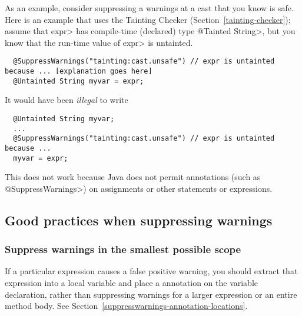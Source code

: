As an example, consider suppressing a warnings at a cast that you know is safe.  Here is an example
that uses the Tainting Checker (Section~\ref{tainting-checker}); assume
that \<expr> has compile-time (declared) type \<@Tainted String>, but you
know that the run-time value of \<expr> is untainted.

\begin{smaller}
\begin{Verbatim}
  @SuppressWarnings("tainting:cast.unsafe") // expr is untainted because ... [explanation goes here]
  @Untainted String myvar = expr;
\end{Verbatim}
\end{smaller}

\noindent
It would have been \emph{illegal} to write

\begin{smaller}
\begin{Verbatim}
  @Untainted String myvar;
  ...
  @SuppressWarnings("tainting:cast.unsafe") // expr is untainted because ...
  myvar = expr;
\end{Verbatim}
\end{smaller}

\noindent
This does not work because
Java does not permit annotations (such as \<@SuppressWarnings>) on
assignments or other statements or expressions.


\subsection{Good practices when suppressing warnings\label{suppresswarnings-best-practices}}

\subsubsection{Suppress warnings in the smallest possible scope\label{suppresswarnings-best-practices-smallest-scope}}

If a particular expression causes a
false positive warning, you should extract that expression into a local variable
and place a  annotation on the variable
declaration, rather than suppressing warnings for a larger expression or an
entire method body.  See Section~\ref{suppresswarnings-annotation-locations}.



